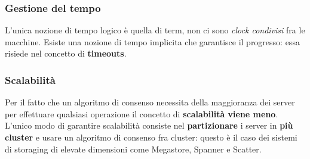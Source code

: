   \subsubsection{Gestione del tempo}
  L'unica nozione di tempo logico è quella di term, non ci sono \textit{clock condivisi} fra le macchine. Esiste una nozione di tempo implicita che garantisce il progresso: essa risiede nel concetto di \textbf{timeouts}.

  \subsubsection{Scalabilità}
  Per il fatto che un algoritmo di consenso necessita della maggioranza dei server per effettuare qualsiasi operazione il concetto di \textbf{scalabilità viene meno}. L'unico modo di garantire scalabilità consiste nel \textbf{partizionare} i server in \textbf{più cluster} e usare un algoritmo di consenso fra cluster: questo è il caso dei sistemi di storaging di elevate dimensioni come Megastore, Spanner e Scatter.